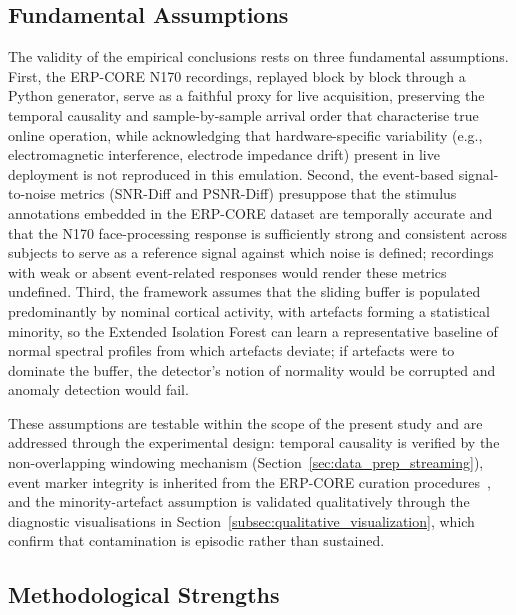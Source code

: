 \documentclass[MScCS,12pt,oneside,final]{uccthesis}
\begin{document}
\subsection{Fundamental Assumptions}
\label{subsec:fundamental_assumptions}

The validity of the empirical conclusions rests on three fundamental assumptions. First, the ERP-CORE N170 recordings, replayed block by block through a Python generator, serve as a faithful proxy for live acquisition, preserving the temporal causality and sample-by-sample arrival order that characterise true online operation, while acknowledging that hardware-specific variability (e.g., electromagnetic interference, electrode impedance drift) present in live deployment is not reproduced in this emulation. Second, the event-based signal-to-noise metrics (SNR-Diff and PSNR-Diff) presuppose that the stimulus annotations embedded in the ERP-CORE dataset are temporally accurate and that the N170 face-processing response is sufficiently strong and consistent across subjects to serve as a reference signal against which noise is defined; recordings with weak or absent event-related responses would render these metrics undefined. Third, the framework assumes that the sliding buffer is populated predominantly by nominal cortical activity, with artefacts forming a statistical minority, so the Extended Isolation Forest can learn a representative baseline of normal  spectral profiles from which artefacts deviate; if artefacts were to dominate the buffer, the detector's notion of normality would be corrupted and anomaly detection would fail.

These assumptions are testable within the scope of the present study and are addressed through the experimental design: temporal causality is verified by the non-overlapping windowing mechanism (Section~\ref{sec:data_prep_streaming}), event marker integrity is inherited from the ERP-CORE curation procedures~\parencite{kappenman2021erp}, and the minority-artefact assumption is validated qualitatively through the diagnostic visualisations in Section~\ref{subsec:qualitative_visualization}, which confirm that contamination is episodic rather than sustained.

\subsection{Methodological Strengths}
\label{subsec:methodological_strengths}
 
\end{document}
